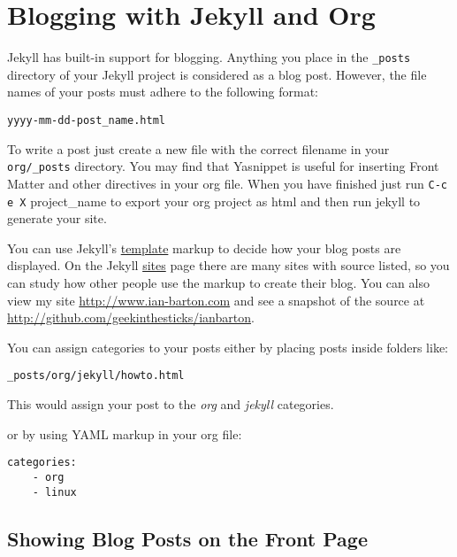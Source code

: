 \documentclass{article}
\begin{document}
\section{Blogging with Jekyll and Org}
\label{sec-6}


Jekyll has built-in support for blogging. Anything you place in the
\texttt{\_posts} directory of your Jekyll project is considered as a blog post.
However, the file names of your posts must adhere to the following
format:


\begin{verbatim}
yyyy-mm-dd-post_name.html
\end{verbatim}

To write a post just create a new file with the correct filename in your
\texttt{org/\_posts} directory. You may find that Yasnippet is useful for
inserting Front Matter and other directives in your org file. When you
have finished just run \texttt{C-c e X} project\_name to export your org
project as html and then run jekyll to generate your site.

You can use Jekyll's
\href{http://wiki.github.com/mojombo/jekyll/template-data}{template} markup
to decide how your blog posts are displayed. On the Jekyll
\href{http://wiki.github.com/mojombo/jekyll/sites}{sites} page there are
many sites with source listed, so you can study how other people use the
markup to create their blog. You can also view my site
\href{http://www.ian-barton.com}{http://www.ian-barton.com} and see a
snapshot of the source at
\href{http://github.com/geekinthesticks/ianbarton}{http://github.com/geekinthesticks/ianbarton}.

You can assign categories to your posts either by placing posts inside
folders like:


\begin{verbatim}
_posts/org/jekyll/howto.html
\end{verbatim}

This would assign your post to the \emph{org} and \emph{jekyll} categories.

or by using YAML markup in your org file:


\begin{verbatim}
categories:
    - org
    - linux
\end{verbatim}
\subsection{Showing Blog Posts on the Front Page}
\label{sec-6-1}
\end{document}
